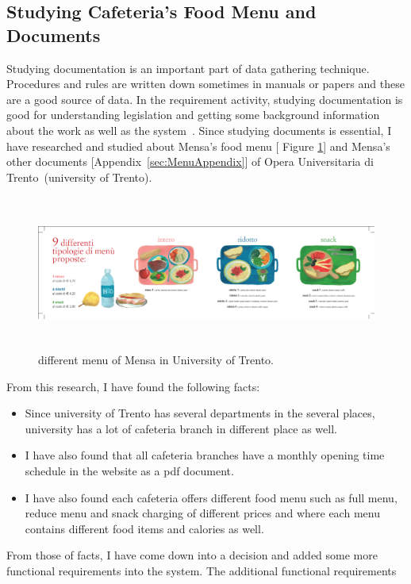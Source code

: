 \subsection{Studying Cafeteria's Food Menu and Documents}
\label{subsec:MensaDocuments}
Studying documentation is an important part of data gathering technique.
Procedures and rules are written down sometimes in manuals or papers and these
are a good source of data. In the requirement activity, studying documentation
is good for understanding legislation and getting some background information
about the work as well as the system~\cite{preece2002interaction}. Since
studying documents is essential, I have researched and studied about Mensa's
food menu [ Figure \ref{fig:differentmenu}] and Mensa's other documents
[Appendix~\ref{sec:MenuAppendix}] of Opera Universitaria di
Trento~\cite{operauniversity}(university of Trento).
\begin{figure}[h!t]
    \centering
      \includegraphics[width=5.5in,height=2in]{ch3/AppendixMenu/differentmenu}
  \caption{different menu of Mensa in University of Trento.}
  \label{fig:differentmenu}
\end{figure}
From this research, I have found the following facts:
\begin{itemize}
\item Since university of Trento has several departments in the several places,
university has a lot of cafeteria branch in different place as well.
\item I have also found that all cafeteria branches have a monthly opening time
schedule in the website as a pdf document.
\item I have also found each cafeteria offers different food menu such as full
menu, reduce menu and snack charging of different prices and where each menu contains
different food items and calories as well.
\end{itemize}
From those of facts, I have come down into a decision and added some more
functional requirements into the system. The additional functional requirements
